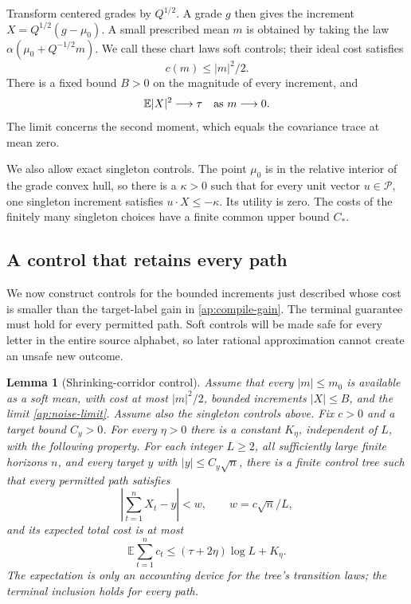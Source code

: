 \documentclass[11pt]{article}
\numberwithin{equation}{section}
\newtheorem{lemma}[theorem]{Lemma}
\theoremstyle{definition}
\theoremstyle{remark}
\newcommand{\E}{\mathbb E}
\begin{document}
Transform centered grades by \(Q^{1/2}\).  A grade \(g\) then gives the
increment \(X=Q^{1/2}(g-\mu_0)\).  A small prescribed mean \(m\) is
obtained by taking the law
\(\alpha(\mu_0+Q^{-1/2}m)\).  We call these chart laws soft controls;
their ideal cost satisfies
\begin{equation}\label{ap:drift-cost}
 c(m)\leq |m|^2/2.
\end{equation}
There is a fixed bound \(B>0\) on the magnitude of every increment, and
\begin{equation}\label{ap:noise-limit}
 \E|X|^2\longrightarrow\tau\quad\hbox{as }m\longrightarrow0.
\end{equation}
The limit concerns the second moment, which equals the covariance trace
at mean zero.

We also allow exact singleton controls.  The point \(\mu_0\) is in the
relative interior of the grade convex hull, so there is a \(\kappa>0\)
such that for every unit vector \(u\in\mathcal P\), one singleton
increment satisfies \(u\cdot X\leq-\kappa\).  Its utility is zero.
The costs of the finitely many singleton choices have a finite common
upper bound \(C_*\).

\subsection{A control that retains every path}

We now construct controls for the bounded increments just described whose
cost is smaller than the target-label gain in \eqref{ap:compile-gain}.
The terminal guarantee must hold for every permitted path.  Soft controls
will be made safe for every letter in the entire source alphabet, so later
rational approximation cannot create an unsafe new outcome.

\begin{lemma}[Shrinking-corridor control]\label{ap:corridor}
Assume that every \(|m|\leq m_0\) is available as a soft mean, with
cost at most \(|m|^2/2\), bounded increments \(|X|\leq B\), and the
limit \eqref{ap:noise-limit}.  Assume also the singleton controls above.
Fix \(c>0\) and a target bound \(C_y>0\).  For every \(\eta>0\)
there is a constant \(K_\eta\), independent of \(L\), with the following
property.  For each integer \(L\geq2\), all sufficiently large finite
horizons \(n\), and every target \(y\) with \(|y|\leq C_y\sqrt n\),
there is a finite control tree such that every permitted path satisfies
\[
 \left|\sum_{t=1}^n X_t-y\right|<w,
 \qquad w=c\sqrt n/L,
\]
and its expected total cost is at most
\begin{equation}\label{ap:total-cost}
 \E\sum_{t=1}^n c_t\leq(\tau+2\eta)\log L+K_\eta.
\end{equation}
The expectation is only an accounting device for the tree's transition
laws; the terminal inclusion holds for every path.
\end{lemma}
\end{document}
